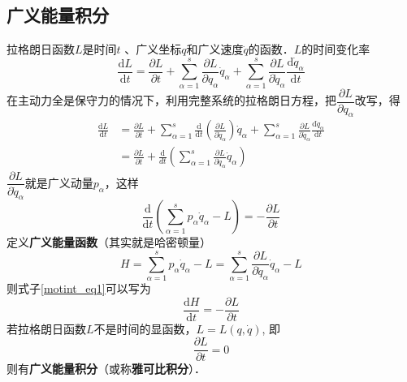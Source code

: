 \subsection{广义能量积分}

拉格朗日函数$L $是时间$t$ 、广义坐标$q $和广义速度$\dot q$的函数．$ L $的时间变化率
\begin{equation}
\frac{\mathrm{d} L}{\mathrm{d} t}=\frac{\partial L}{\partial t}+\sum_{\alpha=1}^{s} \frac{\partial L}{\partial q_{\alpha}} \dot{q}_{\alpha}+\sum_{\alpha=1}^{s} \frac{\partial L}{\partial \dot{q}_{\alpha}} \frac{\mathrm{d} \dot{q}_{\alpha}}{\mathrm{d} t}
\end{equation}
在主动力全是保守力的情况下，利用完整系统的拉格朗日方程，把$\dfrac{\partial L}{\partial q_{\alpha}}$改写，得
\begin{equation}
\begin{aligned} \frac{\mathrm{d} L}{\mathrm{d} t} &=\frac{\partial L}{\partial t}+\sum_{\alpha=1}^{s} \frac{\mathrm{d}}{\mathrm{d} t}\left(\frac{\partial L}{\partial \dot{q}_{\alpha}}\right) \dot{q}_{\alpha}+\sum_{\alpha=1}^{s} \frac{\partial L}{\partial \dot{q}_{\alpha}} \frac{\mathrm{d} \dot{q}_{\alpha}}{\mathrm{d} t} \\ &=\frac{\partial L}{\partial t}+\frac{\mathrm{d}}{d t}\left(\sum_{\alpha=1}^{s} \frac{\partial L}{\partial \dot{q}_{\alpha}} \dot{q}_{\alpha}\right) \end{aligned}
\end{equation}
$\dfrac{\partial L}{\partial \dot{q}_{\alpha}}$就是广义动量$p_\alpha$，这样
\begin{equation} \label{motint_eq1}
\frac{\mathrm{d}}{\mathrm{d} t}\left(\sum_{\alpha=1}^{s} p_{\alpha} \dot{q}_{\alpha}-L\right)=-\frac{\partial L}{\partial t}
\end{equation}
定义\textbf{广义能量函数}（其实就是哈密顿量）
\begin{equation} \label{motint_eq2}
H=\sum_{\alpha=1}^{s} p_{\alpha} \dot{q}_{\alpha}-L=\sum_{\alpha=1}^{s} \frac{\partial L}{\partial \dot{q}_{\alpha}} \dot{q}_{\alpha}-L
\end{equation}
则式子\autoref{motint_eq1}可以写为
\begin{equation}
\frac{\mathrm{d} H}{\mathrm{d} t}=-\frac{\partial L}{\partial t}
\end{equation}
若拉格朗日函数$L$不是时间的显函数，$ L = L(q, \dot q)$, 即
\begin{equation}
\frac{\partial L}{\partial t}=0
\end{equation}
则有\textbf{广义能量积分}（或称\textbf{雅可比积分}）．

